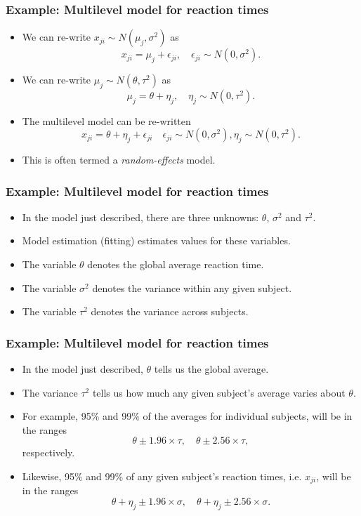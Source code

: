 \documentclass[10pt,xcolor=dvipsnames,serif,professionalfont]{beamer} %
\begin{document}
\begin{frame}
\frametitle{Example: Multilevel model for reaction times}
\begin{itemize}
\item We can re-write $x_{ji} \sim N(\mu_j,\sigma^2)$ as 
\[ x_{ji} = \mu_j + \epsilon_{ji},\quad \epsilon_{ji} \sim N(0,\sigma^2).\]
\item We can re-write $\mu_j\sim N(\theta,\tau^2)$ as 
\[ \mu_j = \theta + \eta_j, \quad \eta_{j} \sim N(0,\tau^2).\]
\item The multilevel model can be re-written 
\[ x_{ji} = \theta + \eta_j + \epsilon_{ji}\quad \epsilon_{ji} \sim N(0,\sigma^2), \eta_{j} \sim N(0,\tau^2).\]
\item This is often termed a \emph{random-effects} model.
\end{itemize}
\end{frame}

\begin{frame}
\frametitle{Example: Multilevel model for reaction times}
\begin{itemize}
\item In the model just described, there are three unknowns: $\theta$, $\sigma^2$ and $\tau^2$.
\item Model estimation (fitting) estimates values for these variables.
\item The variable $\theta$ denotes the global average reaction time.
\item The variable $\sigma^2$ denotes the variance within any given subject.
\item The variable $\tau^2$ denotes the variance across subjects.
\end{itemize}
\end{frame}

\begin{frame}
\frametitle{Example: Multilevel model for reaction times}
\begin{itemize}
\item In the model just described, $\theta$ tells us the global average.
\item The variance $\tau^2$ tells us how much any given subject's average varies about $\theta$.
\item For example, 95\% and 99\% of the averages for individual subjects,  will be in the ranges
\[\theta \pm 1.96 \times \tau,\quad  \theta \pm 2.56 \times \tau,\]
respectively.
\item Likewise, 95\% and 99\% of any given subject's reaction times, i.e. $x_{ji}$, will be in the ranges
\[\theta + \eta_j   \pm 1.96 \times \sigma,\quad \theta + \eta_j  \pm 2.56 \times \sigma.\]
\end{itemize}
\end{frame}
\end{document}
